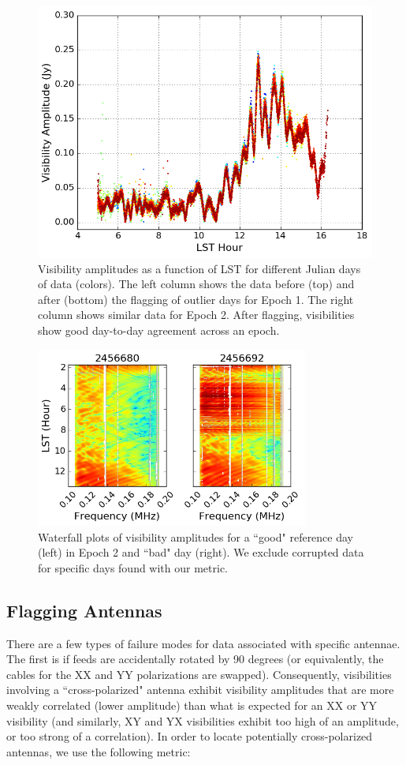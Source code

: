 \begin{figure}
	\includegraphics[trim={0cm 0cm 0cm 0cm},clip,height=0.35\textwidth]{plots/psa128_meanVij_S1E2_after.png}
	\caption{Visibility amplitudes as a function of LST for different Julian days of data (colors). The left column shows the data before (top) and after (bottom) the flagging of outlier days for Epoch 1. The right column shows similar data for Epoch 2. After flagging, visibilities show good day-to-day agreement across an epoch.}
	\label{fig:psa128_meanVij}
\end{figure}

\begin{figure}
	\centering
	\includegraphics[width=0.8\textwidth]{plots/psa128_badday.png}
	\caption{Waterfall plots of visibility amplitudes for a ``good" reference day (left) in Epoch 2 and ``bad" day (right). We exclude corrupted data for specific days found with our metric.}
	\label{fig:psa128_badday}
\end{figure}

\subsection{Flagging Antennas}
\label{sec:psa128_badant}

There are a few types of failure modes for data associated with specific antennae. The first is if feeds are accidentally rotated by 90 degrees (or equivalently, the cables for the XX and YY polarizations are swapped). Consequently, visibilities involving a ``cross-polarized" antenna exhibit visibility amplitudes that are more weakly correlated (lower amplitude) than what is expected for an XX or YY visibility (and similarly, XY and YX visibilities exhibit too high of an amplitude, or too strong of a correlation). In order to locate potentially cross-polarized antennas, we use the following metric:

